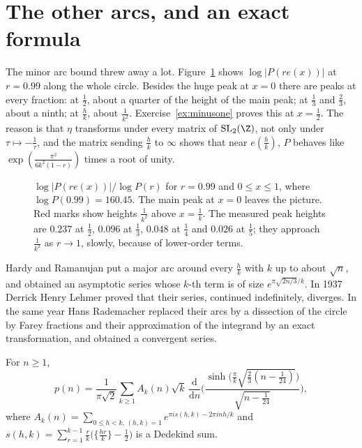 \section{The other arcs, and an exact formula}

The minor arc bound threw away a lot. Figure~\ref{fig:circlearcs} shows $\log|P(re(x))|$ at $r=0.99$ along the whole circle. Besides the huge peak at $x=0$ there are peaks at every fraction: at $\frac12$, about a quarter of the height of the main peak; at $\frac13$ and $\frac23$, about a ninth; at $\frac hk$, about $\frac1{k^2}$. Exercise~\ref{ex:minusone} proves this at $x=\frac12$. The reason is that $\eta$ transforms under every matrix of $\mathrm{SL}_2(\Z)$, not only under $\tau\mapsto-\frac1\tau$, and the matrix sending $\frac hk$ to $\infty$ shows that near $e(\frac hk)$, $P$ behaves like $\exp(\frac{\pi^2}{6k^2(1-r)})$ times a root of unity.

\begin{figure}[ht]
\centering
{}
\caption{$\log|P(re(x))|/\log P(r)$ for $r=0.99$ and $0\le x\le1$, where $\log P(0.99)=160.45$. The main peak at $x=0$ leaves the picture. Red marks show heights $\frac1{k^2}$ above $x=\frac1k$. The measured peak heights are $0.237$ at $\frac12$, $0.096$ at $\frac13$, $0.048$ at $\frac14$ and $0.026$ at $\frac15$; they approach $\frac1{k^2}$ as $r\to1$, slowly, because of lower-order terms.}
\label{fig:circlearcs}
\end{figure}

Hardy and Ramanujan put a major arc around every $\frac hk$ with $k$ up to about $\sqrt n$, and obtained an asymptotic series whose $k$-th term is of size $e^{\pi\sqrt{2n/3}/k}$. In 1937 Derrick Henry Lehmer proved that their series, continued indefinitely, diverges. In the same year Hans Rademacher replaced their arcs by a dissection of the circle by Farey fractions and their approximation of the integrand by an exact transformation, and obtained a convergent series.

\begin{theorem}\label{thm:rademacher}
For $n\ge1$,
\[
p(n)=\frac1{\pi\sqrt2}\sum_{k\ge1}A_k(n)\sqrt k\,\frac{\mathrm d}{\mathrm dn}\Biggl(\frac{\sinh\bigl(\frac\pi k\sqrt{\frac23(n-\frac1{24})}\bigr)}{\sqrt{n-\frac1{24}}}\Biggr),
\]
where $A_k(n)=\sum_{0\le h<k,\,(h,k)=1}e^{\pi is(h,k)-2\pi inh/k}$ and $s(h,k)=\sum_{r=1}^{k-1}\frac rk\bigl(\{\frac{hr}k\}-\frac12\bigr)$ is a Dedekind sum.
\end{theorem}

